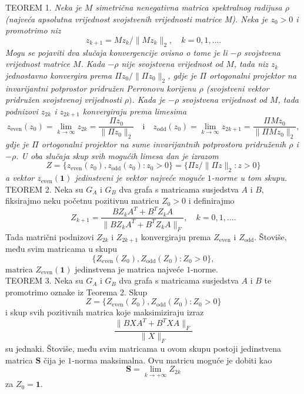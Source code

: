\documentclass[12pt, letterpaper]{article}
\numberwithin{figure}{section}
\begin{document}
TEOREM 1.  \textit{Neka je $M$ simetrična nenegativna matrica spektralnog radijusa $\rho$ (najveća apsolutna vrijednost svojstvenih vrijednosti matrice M). Neka je $z_0 > 0$ i promotrimo niz}
\[
z_{k+1} = M z_k / \|M z_k\|_2, \quad k = 0, 1, \dots.
\]
\textit{Mogu se pojaviti dva slučaja konvergencije ovisno o tome je li $-\rho$ svojstvena vrijednost matrice $M$. Kada $-\rho$ nije svojstvena vrijednost od $M$, tada niz $z_k$ jednostavno konvergira prema $\Pi z_0 / \|\Pi z_0\|_2$, gdje je $\Pi$ ortogonalni projektor na invarijantni potprostor pridružen Perronovu korijenu $\rho$ (svojstveni vektor pridružen svojstvenoj vrijednosti $\rho)$. Kada je $-\rho$ svojstvena vrijednost od $M$, tada podnizovi $z_{2k}$ i $z_{2k+1}$ konvergiraju prema limesima}
\[
z_{\text{even}}(z_0) = \lim_{k\to\infty} z_{2k} = \frac{\Pi z_0}{\|\Pi z_0\|_2}
\quad \text{i} \quad
z_{\text{odd}}(z_0) = \lim_{k\to\infty} z_{2k+1} = \frac{\Pi M z_0}{\|\Pi M z_0\|_2},
\]
\textit{gdje je $\Pi$ ortogonalni projektor na sume invarijantnih potprostora pridruženih $\rho$ i $-\rho$. U oba slučaja skup svih mogućih limesa dan je izrazom}
\[
Z = \{z_{\text{even}}(z_0), z_{\text{odd}}(z_0) : z_0 > 0\} = \{\Pi z / \|\Pi z\|_2 : z > 0\}
\]
\textit{a vektor $z_{\text{even}}(\mathbf{1})$ jedinstveni je vektor najveće moguće $1$-norme u tom skupu.}\\

TEOREM 2. Neka su $G_A$ i $G_B$ dva grafa s matricama susjedstva $A$ i $B$, fiksirajmo neku početnu pozitivnu matricu $Z_0 > 0$ i definirajmo
\[
Z_{k+1} = \frac{B Z_k A^T + B^T Z_k A}{\|B Z_k A^T + B^T Z_k A\|_F}, \quad k = 0, 1, \dots.
\]
Tada matrični podnizovi $Z_{2k}$ i $Z_{2k+1}$ konvergiraju prema $Z_{\mathrm{even}}$ i $Z_{\mathrm{odd}}$. Štoviše, među svim matricama u skupu
\[
\{Z_{\mathrm{even}}(Z_0), Z_{\mathrm{odd}}(Z_0) : Z_0 > 0\},
\]
matrica $Z_{\mathrm{even}}(\mathbf{1})$ jedinstvena je matrica najveće $1$-norme.\\


TEOREM 3. Neka su $G_A$ i $G_B$ dva grafa s matricama susjedstva $A$ i $B$ te promotrimo oznake iz Teorema 2. Skup
\[
Z = \{Z_{\mathrm{even}}(Z_0), Z_{\mathrm{odd}}(Z_0) : Z_0 > 0\}
\]
i skup svih pozitivnih matrica koje maksimiziraju izraz
\[
\frac{\|B X A^T + B^T X A\|_F}{\|X\|_F}
\]
su jednaki. Štoviše, među svim matricama u ovom skupu postoji jedinstvena matrica $\mathbf{S}$ čija je $1$-norma maksimalna. Ovu matricu moguće je dobiti kao
\[
\mathbf{S} = \lim_{k \to +\infty} Z_{2k}
\]
za $Z_0 = \mathbf{1}$.
\end{document}
